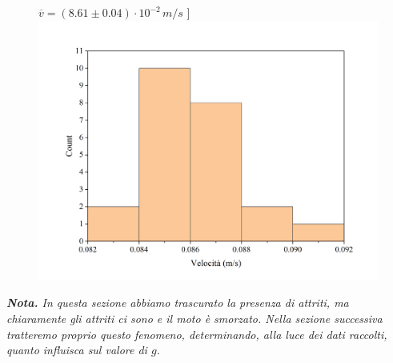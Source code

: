 \documentclass{article}
\begin{document}
\begin{center}
\begin{figure}[H]
      $\overline{v}=(8.61\pm0.04)\cdot10^{-2}\,\unit{m\per s}$
    ]{\includegraphics[trim={1cm 0.6cm 1cm 1cm},clip,width=.49\textwidth]{img/m2.png}}
    \hfil{}
    \hfil{}
  \end{figure}
\end{center}

\vspace{2mm}
\pagebreak
\emph{
  \textbf{Nota.} In questa sezione abbiamo trascurato la presenza di
  attriti, ma chiaramente gli attriti ci sono e il moto è smorzato.
  Nella sezione successiva tratteremo proprio questo fenomeno,
  determinando, alla luce dei dati raccolti, quanto influisca
  sul valore di $g$.
}
\vspace{2mm}
\end{document}
